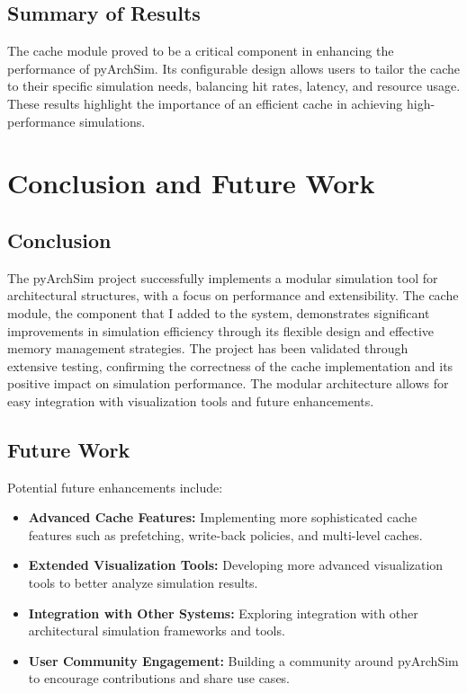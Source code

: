\documentclass[12pt,a4paper]{report}
\begin{document}
\subsection{Summary of Results}
The cache module proved to be a critical component in enhancing the performance of pyArchSim. Its configurable design allows users to tailor the cache to their specific simulation needs, balancing hit rates, latency, and resource usage. These results highlight the importance of an efficient cache in achieving high-performance simulations.


\section{Conclusion and Future Work}
\subsection{Conclusion}
The pyArchSim project successfully implements a modular simulation tool for architectural structures, with a focus on performance and extensibility. The cache module, the component that I added to the system, demonstrates significant improvements in simulation efficiency through its flexible design and effective memory management strategies.
The project has been validated through extensive testing, confirming the correctness of the cache implementation and its positive impact on simulation performance. The modular architecture allows for easy integration with visualization tools and future enhancements.

\subsection{Future Work}
Potential future enhancements include:
\begin{itemize}
  \item \textbf{Advanced Cache Features:} Implementing more sophisticated cache features such as prefetching, write-back policies, and multi-level caches.
  \item \textbf{Extended Visualization Tools:} Developing more advanced visualization tools to better analyze simulation results.
  \item \textbf{Integration with Other Systems:} Exploring integration with other architectural simulation frameworks and tools.
  \item \textbf{User Community Engagement:} Building a community around pyArchSim to encourage contributions and share use cases.
\end{itemize}



\end{document}
